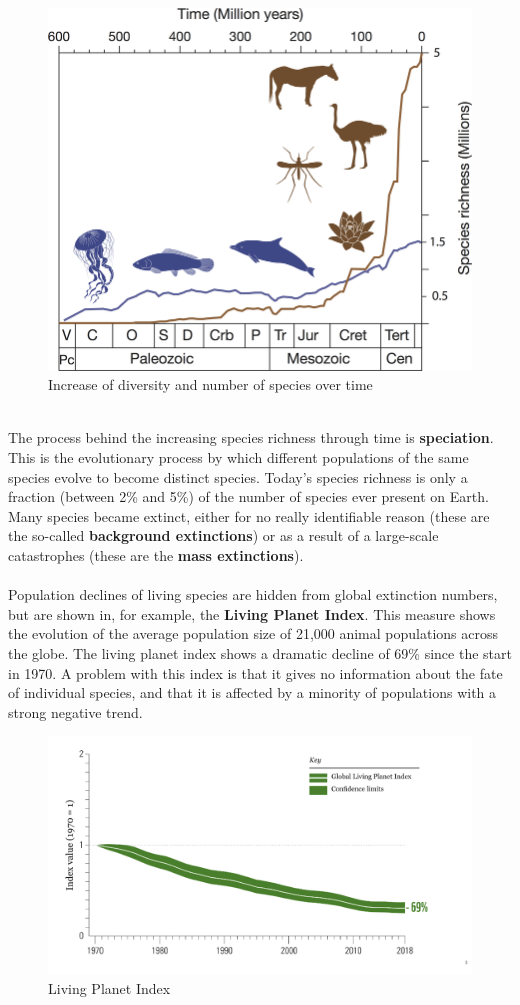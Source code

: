 \documentclass[../summary.tex]{subfiles}
\begin{document}
	\begin{figure}[H]
		\centering
		\includegraphics[width=0.45\linewidth]{../images/2-historical-evolution-of-biodiversity}
		\caption{Increase of diversity and number of species over time}
		\label{fig:historical-evolution-of-biodiversity}
	\end{figure}
	\ \\
	The process behind the increasing species richness through time is \textbf{speciation}. This is the evolutionary process by which different populations of the same species evolve to become distinct species. Today's species richness is only a fraction (between 2\% and 5\%) of the number of species ever present on Earth. Many species became extinct, either for no really identifiable reason (these are the so-called \textbf{background extinctions}) or as a result of a large-scale catastrophes (these are the \textbf{mass extinctions}).
	\\
	\\
	Population declines of living species are hidden from global extinction numbers, but are shown in, for example, the \textbf{Living Planet Index}. This measure shows the evolution of the average population size of 21,000 animal populations across the globe. The living planet index shows a dramatic decline of 69\% since the start in 1970.  A problem with this index is that it gives no information about the fate of individual species, and that it is affected by a minority of populations with a strong negative trend.
	
	\begin{figure}[H]
		\centering
		\includegraphics[width=0.7\linewidth]{../images/2-living-planet-index}
		\caption{Living Planet Index}
		\label{fig:living-planet-index}
	\end{figure}
	
\end{document}
